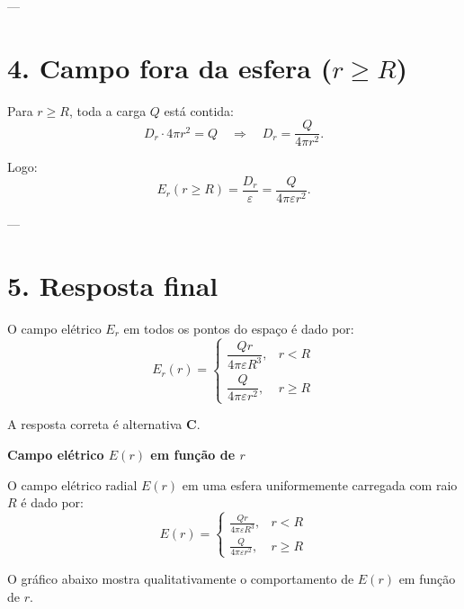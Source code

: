 \documentclass[a4paper,12pt]{article}
\begin{document}
\begin{flushleft}
---

\section*{4. Campo fora da esfera (\( r \geq R \))}

Para \( r \geq R \), toda a carga \( Q \) está contida:
\[
D_r \cdot 4\pi r^2 = Q \quad \Rightarrow \quad D_r = \frac{Q}{4\pi r^2}.
\]

Logo:
\[
E_r(r \geq R) =
\frac{D_r}{\varepsilon} =
\frac{Q}{4\pi \varepsilon r^2}.
\]

---

\section*{5. Resposta final}

O campo elétrico \( E_r \) em todos os pontos do espaço é dado por:
\[
\boxed{
E_r(r) =
\begin{cases}
\dfrac{Q r}{4\pi \varepsilon R^3}, & r < R \\[12pt]
\dfrac{Q}{4\pi \varepsilon r^2}, & r \geq R
\end{cases}
}
\]

A resposta correta é alternativa \colorbox{green!50}{\textbf{C}}.
\end{flushleft}

\begin{center}
\textbf{Campo elétrico \(E(r)\) em função de \(r\)}
\end{center}

O campo elétrico radial \(E(r)\) em uma esfera uniformemente carregada com raio \(R\) é dado por:
\[
E(r) =
\begin{cases}
\displaystyle \frac{Q r}{4\pi \varepsilon R^3}, & r < R \\[12pt]
\displaystyle \frac{Q}{4\pi \varepsilon r^2}, & r \geq R
\end{cases}
\]

O gráfico abaixo mostra qualitativamente o comportamento de \(E(r)\) em função de \(r\).

\bigskip

\begin{center}
\end{center}
\end{document}
